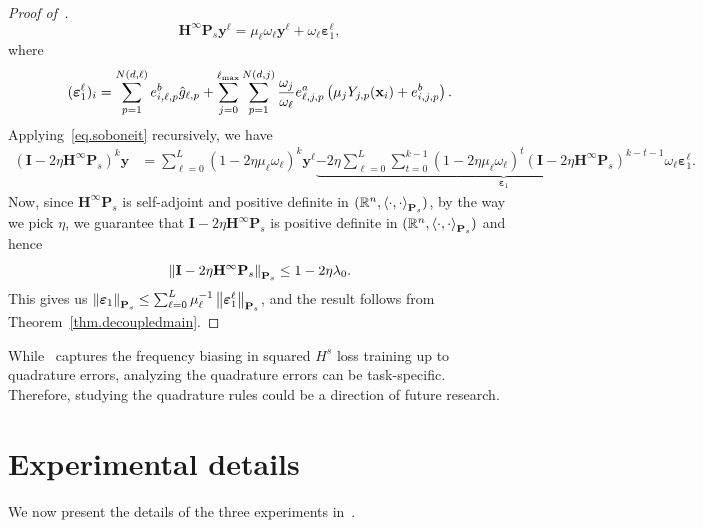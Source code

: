 \begin{proof}[Proof of~]
\begin{equation}
    {\mathbf{H}}^\infty \mathbf{P}_s \mathbf{y}^\ell = \mu_\ell \omega_\ell \mathbf{y}^\ell + \omega_\ell\boldsymbol{\varepsilon}^\ell_1,
\end{equation}
where 
\begin{equation}
    (\boldsymbol{\varepsilon}_1^\ell)_i = \sum_{p=1}^{N(d,\ell)} e_{i,\ell,p}^b \hat{g}_{\ell,p} + \sum_{j = 0}^{\ell_{\text{max}}} \sum_{p=1}^{N(d,j)} \frac{\omega_{j}}{\omega_\ell} e^a_{\ell,j,p} \left(\mu_j Y_{j,p}(\mathbf{x}_i) + e_{i,j,p}^b\right).
\end{equation}
Applying~\cref{eq.soboneit} recursively, we have
\begin{align*}
    (\mathbf{I} \!-\! 2\eta {\mathbf{H}}^\infty\mathbf{P}_s)^k\mathbf{y} &= \sum_{\ell=0}^L \left(1-2\eta\mu_\ell\omega_\ell\right)^k \mathbf{y}^\ell \underbrace{- 2\eta \sum_{\ell=0}^{L} \sum_{t = 0}^{k-1} \left(1-2\eta\mu_\ell\omega_\ell\right)^t (\mathbf{I} \!-\! 2\eta {\mathbf{H}}^\infty\mathbf{P}_s)^{k-t-1} \omega_\ell\boldsymbol{\varepsilon}^\ell_1}_{\boldsymbol{\varepsilon}_1}.
\end{align*}
Now, since ${\mathbf{H}}^\infty \mathbf{P}_s$ is self-adjoint and positive definite in $(\mathbb{R}^n, \left\langle \cdot, \cdot \right\rangle_{\mathbf{P}_s})$, by the way we pick $\eta$, we guarantee that $\mathbf{I} - 2\eta{\mathbf{H}}^\infty \mathbf{P}_s$ is positive definite in $(\mathbb{R}^n, \left\langle \cdot, \cdot \right\rangle_{\mathbf{P}_s})$ and hence
\begin{equation*}
    \left\lVert\mathbf{I} - 2\eta{\mathbf{H}}^\infty \mathbf{P}_s\right\rVert_{\mathbf{P}_s} \leq 1 - 2\eta \lambda_0.
\end{equation*}
This gives us $\left\lVert\boldsymbol{\varepsilon}_1\right\rVert_{\mathbf{P}_s} \leq \sum_{\ell = 0}^L \mu_\ell^{-1} \left\lVert\boldsymbol{\varepsilon}_1^\ell\right\rVert_{\mathbf{P}_s}$, and the result follows from Theorem~\ref{thm.decoupledmain}.
\end{proof}

While~ captures the frequency biasing in squared $H^s$ loss training up to quadrature errors, analyzing the quadrature errors can be task-specific. Therefore, studying the quadrature rules could be a direction of future research.

\section{Experimental details}\label{sec:experiment_sup}
We now present the details of the three experiments in~.

